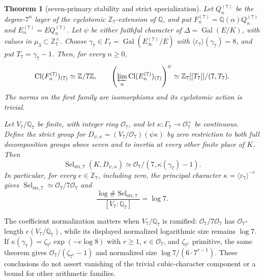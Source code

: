 \documentclass[11pt]{article}
\newtheorem{theorem}{Theorem}[section]
\theoremstyle{remark}\newtheorem{remark}[theorem]{Remark}
\newcommand{\Z}{\mathbb Z}\newcommand{\Q}{\mathbb Q}\newcommand{\F}{\mathbb F}
\newcommand{\Oa}{\mathcal O}\newcommand{\Cl}{\operatorname{Cl}}
\newcommand{\Gal}{\operatorname{Gal}}\newcommand{\len}{\operatorname{length}}
\begin{document}
\begin{theorem}[seven-primary stability and strict specialization]
\label{thm:seven-stability}
Let $Q_n^{(7)}$ be the degree-$7^n$ layer of the cyclotomic
$\Z_7$-extension of $\Q$, and put
$F_n^{(7)}=\Q(\alpha)Q_n^{(7)}$ and
$E_n^{(7)}=EQ_n^{(7)}$.
Let $\psi$ be either faithful character of $\Delta=\Gal(E/K)$,
with values in $\mu_3\subset\Z_7^\times$.
Choose $\gamma_7\in\Gamma_7=\Gal(E_\infty^{(7)}/E)$ with
$\langle\varepsilon_7\rangle(\gamma_7)=8$, and put $T_7=\gamma_7-1$.
Then, for every $n\ge0$,
\[
 \Cl(F_n^{(7)})_{(7)}\simeq\Z/7\Z,\qquad
 \left(\varprojlim_n\Cl(E_n^{(7)})_{(7)}\right)^\psi
 \simeq\Z_7[[T_7]]/(7,T_7).
\]
The norms on the first family are isomorphisms and its cyclotomic action
is trivial.

Let $V_7/\Q_7$ be finite, with integer ring $\Oa_7$, and let
$\kappa:\Gamma_7\to\Oa_7^\times$ be continuous.
Define the strict group for
$D_{\psi,\kappa}=(V_7/\Oa_7)(\psi\kappa)$ by zero restriction to both full
decomposition groups above seven and to inertia at every other finite
place of $K$. Then
\[
 \operatorname{Sel}_{\mathrm{str},7}(K,D_{\psi,\kappa})
 \simeq\Oa_7/(7,\kappa(\gamma_7)-1).
\]
In particular, for every $e\in\Z_7$, including zero, the principal
character $\kappa=\langle\varepsilon_7\rangle^{-e}$ gives
$\operatorname{Sel}_{\mathrm{str},7}\simeq\Oa_7/7\Oa_7$ and
\[
 \frac{\log\#\operatorname{Sel}_{\mathrm{str},7}}
      {[V_7:\Q_7]}=\log7 .
\]
\end{theorem}



The coefficient normalization matters when $V_7/\Q_7$ is ramified:
$\Oa_7/7\Oa_7$ has $\Oa_7$-length $e(V_7/\Q_7)$, while its displayed
normalized logarithmic size remains $\log7$.
If $\kappa(\gamma_7)=\zeta_{7^r}\exp(-e\log8)$ with $r\ge1$,
$e\in\Oa_7$, and $\zeta_{7^r}$ primitive, the same theorem gives
$\Oa_7/(\zeta_{7^r}-1)$ and normalized size
$\log7/(6\cdot7^{r-1})$.
These conclusions do not assert vanishing of the trivial
cubic-character component or a bound for other arithmetic families.
\end{document}

